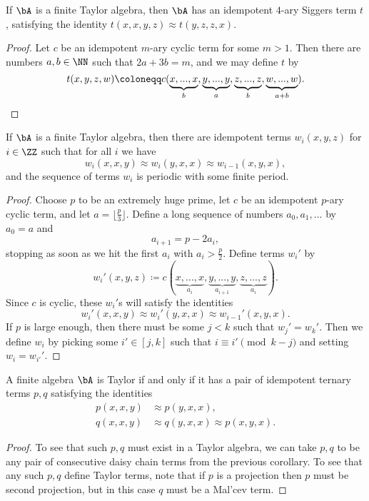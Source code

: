 \begin{cor} If $\bA$ is a finite Taylor algebra, then $\bA$ has an idempotent $4$-ary Siggers term $t$, satisfying the identity $t(x,x,y,z) \approx t(y,z,z,x)$.
\end{cor}
\begin{proof} Let $c$ be an idempotent $m$-ary cyclic term for some $m > 1$. Then there are numbers $a,b \in \NN$ such that $2a+3b = m$, and we may define $t$ by
\[
t(x,y,z,w) \coloneqq c(\underbrace{x,...,x}_{b}, \underbrace{y,...,y}_{a}, \underbrace{z,...,z}_{b}, \underbrace{w,...,w}_{a+b}).\qedhere
\]
\end{proof}

\begin{cor}\label{daisy-chain-terms} If $\bA$ is a finite Taylor algebra, then there are idempotent terms $w_i(x,y,z)$ for $i \in \ZZ$ such that for all $i$ we have
\[
w_i(x,x,y) \approx w_i(y,x,x) \approx w_{i-1}(x,y,x),
\]
and the sequence of terms $w_i$ is periodic with some finite period.
\end{cor}
\begin{proof} Choose $p$ to be an extremely huge prime, let $c$ be an idempotent $p$-ary cyclic term, and let $a = \lfloor\frac{p}{3}\rfloor$. Define a long sequence of numbers $a_0, a_1, ...$ by $a_0 = a$ and
\[
a_{i+1} = p - 2a_i,
\]
stopping as soon as we hit the first $a_i$ with $a_i > \frac{p}{2}$. Define terms $w_i'$ by
\[
w_i'(x,y,z) \coloneqq c(\underbrace{x,...,x}_{a_i}, \underbrace{y,...,y}_{a_{i+1}}, \underbrace{z,...,z}_{a_i}).
\]
Since $c$ is cyclic, these $w_i'$s will satisfy the identities
\[
w_i'(x,x,y) \approx w_i'(y,x,x) \approx w_{i-1}'(x,y,x).
\]
If $p$ is large enough, then there must be some $j < k$ such that $w_j' = w_k'$. Then we define $w_i$ by picking some $i' \in [j,k]$ such that $i \equiv i' \pmod{k-j}$ and setting $w_i = w_{i'}'$.
\end{proof}

\begin{cor}\label{consecutive-daisy} A finite algebra $\bA$ is Taylor if and only if it has a pair of idempotent ternary terms $p,q$ satisfying the identities
\begin{align*}
p(x,x,y) &\approx p(y,x,x),\\
q(x,x,y) &\approx q(y,x,x) \approx p(x,y,x).
\end{align*}
\end{cor}
\begin{proof} To see that such $p,q$ must exist in a Taylor algebra, we can take $p,q$ to be any pair of consecutive daisy chain terms from the previous corollary. To see that any such $p,q$ define Taylor terms, note that if $p$ is a projection then $p$ must be second projection, but in this case $q$ must be a Mal'cev term.
\end{proof}


